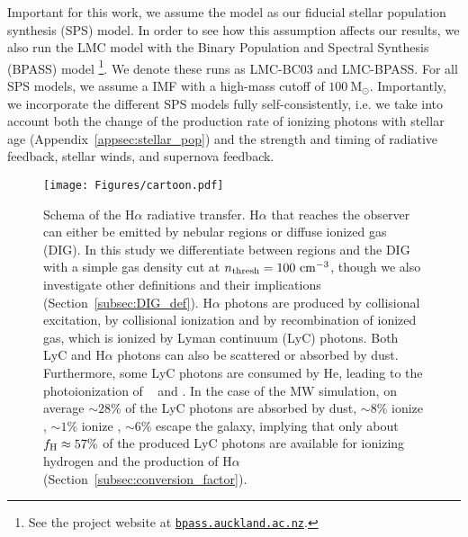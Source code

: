 \documentclass[fleqn,usenatbib]{mnras}
\newcommand\HeI{\ion{He}{I}} %
\newcommand\HeII{\ion{He}{II}} %
\begin{document}
Important for this work, we assume the \citet[][hereafter BC03]{bruzual03} model as our fiducial stellar population synthesis (SPS) model. In order to see how this assumption affects our results, we also run the LMC model with the Binary Population and Spectral Synthesis (BPASS) model \citep[v2.2.1;][]{eldridge09, eldridge17}\footnote{See the project website at \href{https://bpass.auckland.ac.nz}{\texttt{bpass.auckland.ac.nz}}.}. We denote these runs as LMC-BC03 and LMC-BPASS. For all SPS models, we assume a \citet{chabrier03} IMF with a high-mass cutoff of $100~\mathrm{M}_{\odot}$. Importantly, we incorporate the different SPS models fully self-consistently, i.e. we take into account both the change of the production rate of ionizing photons with stellar age (Appendix~\ref{appsec:stellar_pop}) and the strength and timing of radiative feedback, stellar winds, and supernova feedback.

\begin{figure*}
\begin{center}
\texttt{[image: Figures/cartoon.pdf]}
\caption{Schema of the H$\alpha$ radiative transfer. H$\alpha$ that reaches the observer can either be emitted by nebular  regions or diffuse ionized gas (DIG). In this study we differentiate between  regions and the DIG with a simple gas density cut at $n_{\rm thresh}=100~\mathrm{cm}^{-3}$, though we also investigate other definitions and their implications (Section~\ref{subsec:DIG_def}). H$\alpha$ photons are produced by collisional excitation, by collisional ionization and by recombination of ionized gas, which is ionized by Lyman continuum (LyC) photons. Both LyC and H$\alpha$ photons can also be scattered or absorbed by dust. Furthermore, some LyC photons are consumed by He, leading to the photoionization of \HeI~ and \HeII. In the case of the MW simulation, on average $\sim28\%$ of the LyC photons are absorbed by dust, $\sim8\%$ ionize \HeI, $\sim1\%$ ionize \HeII, $\sim6\%$ escape the galaxy, implying that only about $f_{\rm H}\approx57\%$ of the produced LyC photons are available for ionizing hydrogen and the production of H$\alpha$ (Section~\ref{subsec:conversion_factor}).}
\label{fig:cartoon}
\end{center}
\end{figure*}
\end{document}
